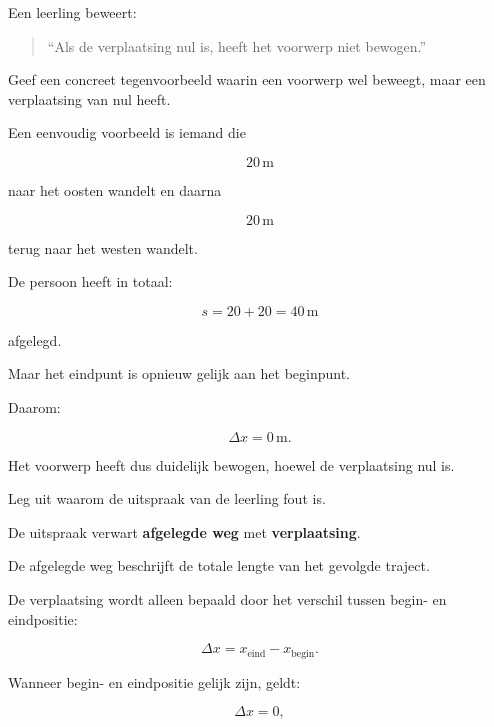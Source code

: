\documentclass{ximera}
\begin{document}
  
  
  \begin{oefening}{\oefU\ESS}
  
  Een leerling beweert:
  
  \begin{quote}
  ``Als de verplaatsing nul is, heeft het voorwerp niet bewogen.''
  \end{quote}
  
  
  \begin{question}
  Geef een concreet tegenvoorbeeld waarin een voorwerp wel beweegt, maar een
  verplaatsing van nul heeft.
  
  \begin{oplossing}
  Een eenvoudig voorbeeld is iemand die
  
  \[
  20\,\mathrm{m}
  \]
  
  naar het oosten wandelt en daarna
  
  \[
  20\,\mathrm{m}
  \]
  
  terug naar het westen wandelt.
  
  De persoon heeft in totaal:
  
  \[
  s=20+20=40\,\mathrm{m}
  \]
  
  afgelegd.
  
  Maar het eindpunt is opnieuw gelijk aan het beginpunt.
  
  Daarom:
  
  \[
  \Delta x=0\,\mathrm{m}.
  \]
  
  Het voorwerp heeft dus duidelijk bewogen, hoewel de verplaatsing nul is.
  \end{oplossing}
  \end{question}
  
  
  \begin{question}
  Leg uit waarom de uitspraak van de leerling fout is.
  
  \begin{oplossing}
  De uitspraak verwart \textbf{afgelegde weg} met \textbf{verplaatsing}.
  
  De afgelegde weg beschrijft de totale lengte van het gevolgde traject.
  
  De verplaatsing wordt alleen bepaald door het verschil tussen begin- en
  eindpositie:
  
  \[
  \Delta x
  =
  x_{\text{eind}}
  -
  x_{\text{begin}}.
  \]
  
  Wanneer begin- en eindpositie gelijk zijn, geldt:
  
  \[
  \Delta x=0,
  \]
  

\end{oplossing}
\end{question}
\end{oefening}
\end{document}
